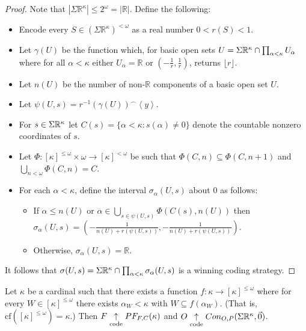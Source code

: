 \begin{proof}
Note that $|\Sigma\mathbb{R}^\kappa| \leq 2^\omega = |\mathbb{R}|$. Define the following:

    \begin{itemize}
    \item Encode every $S \in (\Sigma\mathbb{R}^{\kappa})^{<\omega}$ as a real number $0<r(S)<1$. 
    \item Let $\gamma(U)$ be the function which, for basic open sets $U=\Sigma\mathbb{R}^{\kappa}\cap\prod_{\alpha<\kappa}U_\alpha$ where for all $\alpha<\kappa$ either $U_\alpha=\mathbb{R}$ or $(-\frac{1}{r},\frac{1}{r})$, returns $\lfloor r \rfloor$.
    \item Let $n(U)$ be the number of non-$\mathbb{R}$ components of a basic open set $U$.
    \item Let $\psi(U,s)=r^{-1}(\gamma(U))^\frown\left<y\right>$.
    \item For $s\in\Sigma\mathbb{R}^{\kappa}$ let $C(s)=\{\alpha<\kappa:s(\alpha)\not=0\}$ denote the countable nonzero coordinates of $s$.
    \item Let $\Phi:[\kappa]^{\leq\omega}\times\omega\to[\kappa]^{<\omega}$ be such that $\Phi(C,n)\subseteq\Phi(C,n+1)$ and $\bigcup_{n<\omega}\Phi(C,n)=C$.
    \item For each $\alpha<\kappa$, define the interval $\sigma_\alpha(U,s)$ about $0$ as follows:
        \begin{itemize}
        \item If $\alpha\leq n(U)$ or $\alpha\in\bigcup_{s\in\psi(U,s)}\Phi(C(s),n(U))$ then $\sigma_\alpha(U,s)=(-\frac{1}{n(U)+r(\psi(U,s))},-\frac{1}{n(U)+r(\psi(U,s))})$.
        \item Otherwise, $\sigma_\alpha(U,s)=\mathbb{R}$.
        \end{itemize}
    \end{itemize}

It follows that $\sigma(U,s)=\Sigma\mathbb{R}^{\kappa}\cap\prod_{\alpha<\kappa} \sigma_\alpha(U,s)$ is a winning coding strategy.
\end{proof}

\begin{theorem}
Let $\kappa$ be a cardinal such that there exists a function $f:\kappa\to[\kappa]^{\leq \omega}$ where for every $W\in[\kappa]^{\leq\omega}$ there exists $\alpha_W<\kappa$ with $W\subseteq f(\alpha_W)$. (That is, $\textrm{cf}([\kappa]^{\leq\omega})=\kappa$.) Then $F \underset{\text{code}}{\uparrow} PF_{F,C}(\kappa)$ and $O \underset{\text{code}}{\uparrow} Con_{O,P}(\Sigma\mathbb{R}^{\kappa},\vec{0})$.
\end{theorem}

